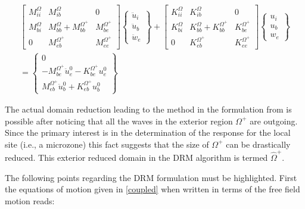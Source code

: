 \documentclass[12pt,letterpaper]{article}
\begin{document}
\begin{equation}
\begin{array}{l}
\left[ {\begin{array}{*{20}{c}}
{M_{ii}^\Omega }&{M_{ib}^\Omega }&0\\
{M_{bi}^\Omega }&{M_{bb}^\Omega  + M_{bb}^{{\Omega ^ + }}}&{M_{be}^{{\Omega ^ + }}}\\
0&{M_{eb}^{{\Omega ^ + }}}&{M_{ee}^{{\Omega ^ + }}}
\end{array}} \right]\left\{ {\begin{array}{*{20}{c}}
{{{\ddot u}_i}}\\
{{{\ddot u}_b}}\\
{{{\ddot w}_e}}
\end{array}} \right\} + \left[ {\begin{array}{*{20}{c}}
{K_{ii}^\Omega }&{K_{ib}^\Omega }&0\\
{K_{bi}^\Omega }&{K_{bb}^\Omega  + K_{bb}^{{\Omega ^ + }}}&{K_{be}^{{\Omega ^ + }}}\\
0&{K_{eb}^{{\Omega ^ + }}}&{K_{ee}^{{\Omega ^ + }}}
\end{array}} \right]\left\{ {\begin{array}{*{20}{c}}
{{u_i}}\\
{{u_b}}\\
{{w_e}}
\end{array}} \right\}\\
 = \left\{ {\begin{array}{*{20}{c}}
0\\
{ - M_{be}^{{\Omega ^ + }}\ddot u_e^0 - K_{be}^{{\Omega ^ + }}u_e^0}\\
{M_{eb}^{{\Omega ^ + }}\ddot u_b^0 + K_{eb}^{{\Omega ^ + }}u_b^0}
\end{array}} \right\}
\end{array}
\label{drm1}
\end{equation}

The actual domain reduction leading to the method in the formulation from \cite{bielak2003} is possible after noticing that all the waves in the exterior region $\Omega^+$ are outgoing. Since the primary interest is in the determination of the response for the local site (i.e., a microzone) this fact suggests that the size of $\Omega^+$ can be drastically reduced. This exterior reduced domain in the DRM algorithm is termed $\hat{\Omega}^+$.

The following points regarding the DRM formulation must be highlighted. First the equations of motion given in \cref{coupled} when written in terms of the free field motion reads:
\end{document}
